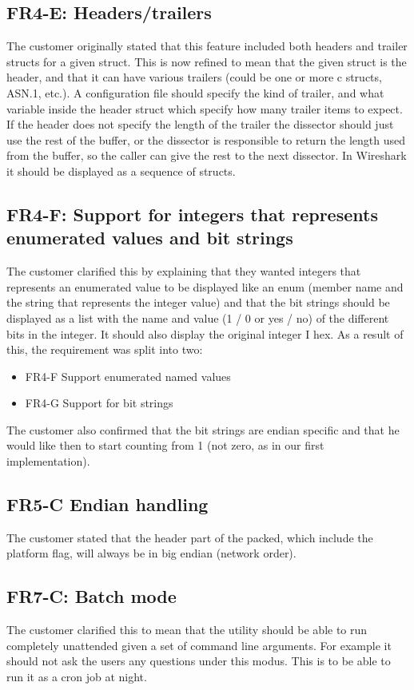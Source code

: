 \subsection*{FR4-E: Headers/trailers}
The customer originally stated that this feature included both headers and trailer structs for a given struct. This is now refined to mean that the given struct is the header, and that it can have various trailers (could be one or more c structs, ASN.1, etc.). A configuration file should specify the kind of trailer, and what variable inside the header struct which specify how many trailer items to expect. If the header does not specify the length of the trailer the dissector should just use the rest of the buffer, or the dissector is responsible to return the length used from the buffer, so the caller can give the rest to the next dissector.
In Wireshark it should be displayed as a sequence of structs.

\subsection*{FR4-F: Support for integers that represents enumerated values and bit strings}
The customer clarified this by explaining that they wanted integers that represents an enumerated value to be displayed like an enum (member name and the string that represents the integer value) and that the bit strings should be displayed as a list with the name and value (1 / 0 or yes / no) of the different bits in the integer. It should also display the original integer I hex. As a result of this, the requirement was split into two:
\begin{itemize}
\item FR4-F	Support enumerated named values
\item FR4-G	Support for bit strings
\end{itemize}
The customer also confirmed that the bit strings are endian specific and that he would like then to start counting from 1 (not zero, as in our first implementation).

\subsection*{FR5-C Endian handling}
The customer stated that the header part of the packed, which include the platform flag, will always be in big endian (network order).

\subsection*{FR7-C: Batch mode}
The customer clarified this to mean that the utility should be able to run completely unattended given a set of command line arguments. For example it should not ask the users any questions under this modus. This is to be able to run it as a cron job at night.

